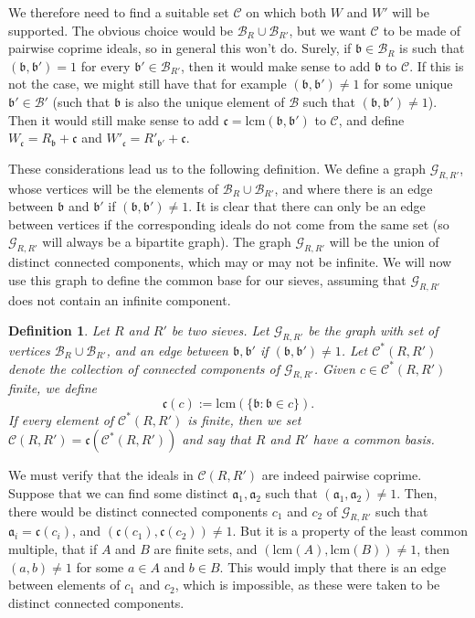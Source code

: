 \documentclass[a4paper,11pt,reqno]{amsart}
\theoremstyle{plain}
\newtheorem{definition}[theorem]{Definition}
\theoremstyle{remark}
\newcommand{\cb}{\mathcal{B}}
\newcommand{\ga}{\mathfrak{a}}
\newcommand{\gb}{\mathfrak{b}}
\newcommand{\gc}{\mathfrak{c}}
\begin{document}
		
		We therefore need to find a suitable set $\mathcal{C}$ on which both $W$ and $W'$ will be supported. The obvious choice would be $\cb_{R} \cup \cb_{R'}$, but we want $\mathcal{C}$ to be made of pairwise coprime ideals, so in general this won't do. Surely, if $\gb \in \cb_{R}$ is such that $(\gb, \gb') = 1$ for every $\gb' \in \cb_{R'}$, then it would make sense to add $\gb$ to $\mathcal{C}$. If this is not the case, we might still have that for example  $(\gb, \gb') \neq 1$ for some unique $\gb'\in \cb'$ (such that $\gb$ is also the unique element of $\cb$ such that $(\gb,\gb')\neq 1$). Then it would still make sense to add $\gc = \text{lcm}(\gb,\gb')$ to $\mathcal{C}$, and define $W_\gc = R_\gb + \gc$ and $W'_\gc = R'_{\gb'} + \gc$. 
		
		
		
		These considerations lead us to the following definition. We define a graph $\mathcal{G}_{R,R'}$, whose vertices will be the elements of $\cb_R \cup \cb_{R'}$, and where there is an edge between $\gb$ and $\gb'$ if $(\gb,\gb') \neq 1$. It is clear that there can only be an edge between vertices if the corresponding ideals do not come from the same set (so  $\mathcal{G}_{R,R'}$ will always be a bipartite graph). The graph $\mathcal{G}_{R,R'}$ will be the union of distinct connected components, which may or may not be infinite. We will now use this graph to define the common base for our sieves, assuming that $\mathcal{G}_{R,R'}$ does not contain an infinite component.
		
		\begin{definition}
			Let $R$ and $R'$ be two sieves. Let $\mathcal{G}_{R,R'}$ be the graph with set of vertices $\cb_R \cup \cb_{R'}$, and an edge between $\gb, \gb'$ if $(\gb,\gb') \neq 1$. Let $\mathcal{C^*}(R,R')$ denote the collection of connected components of $\mathcal{G}_{R,R'}$.  Given $c \in \mathcal{C^*}(R,R')$ finite, we define $$\gc(c) := \text{lcm}(\{\gb: \gb \in c\}).$$  If every element of $\mathcal{C^*}(R,R')$ is finite, then we set $\mathcal{C}(R,R') = \gc(\mathcal{C^*}(R,R'))$ and say that $R$ and $R'$ have a common basis.
		\end{definition} 
		
		We must verify that the ideals in $\mathcal{C}(R,R')$ are indeed pairwise coprime. Suppose that we can find some distinct $\ga_1,\ga_2$ such that $(\ga_1,\ga_2) \neq 1$. Then, there would be distinct connected components $c_1$ and $c_2$ of $\mathcal{G}_{R,R'}$ such that $\ga_i = \gc(c_i)$, and $(\gc(c_1),\gc(c_2)) \neq 1$. But it is a property of the least common multiple, that if $A$ and $B$ are finite sets, and $(\text{lcm}(A),\text{lcm}(B)) \neq 1$, then $(a,b) \neq 1$ for some $a\in A$ and $b \in B$. This would imply that there is an edge between elements of $c_1$ and $c_2$, which is impossible, as these were taken to be distinct connected components.
		
\end{document}

